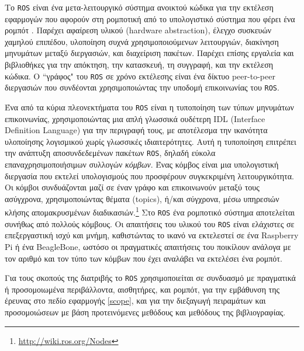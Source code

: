 Το \texttt{ROS} είναι ένα μετα-λειτουργικό σύστημα ανοικτού κώδικα για την
εκτέλεση εφαρμογών που αφορούν στη ρομποτική από το υπολογιστικό σύστημα που
φέρει ένα ρομπότ \cite{Ng2009}. Παρέχει αφαίρεση υλικού (hardware abstraction),
έλεγχο συσκευών χαμηλού επιπέδου, υλοποίηση συχνά χρησιμοποιούμενων
λειτουργιών, διακίνηση μηνυμάτων μεταξύ διεργασιών, και διαχείριση πακέτων.
Παρέχει επίσης εργαλεία και βιβλιοθήκες για την απόκτηση, την κατασκευή, τη
συγγραφή, και την εκτέλεση κώδικα. Ο ``γράφος" του \texttt{ROS} σε χρόνο
εκτέλεσης είναι ένα δίκτυο peer-to-peer διεργασιών που συνδέονται
χρησιμοποιώντας την υποδομή επικοινωνίας του \texttt{ROS}.

Ένα από τα κύρια πλεονεκτήματα του \texttt{ROS} είναι η τυποποίηση των τύπων
μηνυμάτων επικοινωνίας, χρησιμοποιώντας μια απλή γλωσσικά ουδέτερη IDL
(Interface Definition Language) για την περιγραφή τους, με αποτέλεσμα την
ικανότητα υλοποίησης λογισμικού χωρίς γλωσσικές ιδιαιτερότητες. Αυτή η
τυποποίηση επιτρέπει την ανάπτυξη αποσυνδεδεμένων πακέτων \texttt{ROS}, δηλαδή
εύκολα επαναχρησιμοποιήσιμων συλλογών \textit{κόμβων}. Ένας κόμβος είναι μια
υπολογιστική διεργασία που εκτελεί υπολογισμούς που προσφέρουν συγκεκριμένη
λειτουργικότητα. Οι κόμβοι συνδυάζονται μαζί σε έναν γράφο και επικοινωνούν
μεταξύ τους ασύγχρονα, χρησιμοποιώντας θέματα (topics), ή/και σύγχρονα, μέσω
υπηρεσιών κλήσης απομακρυσμένων
διαδικασιών.\footnote{\url{http://wiki.ros.org/Nodes}} Στο \texttt{ROS} ένα
ρομποτικό σύστημα αποτελείται συνήθως από πολλούς κόμβους. Οι απαιτήσεις του
υλικού του \texttt{ROS} είναι ελάχιστες σε επεξεργαστική ισχύ και μνήμη,
καθιστώντας το ικανό να εκτελεστεί σε ένα Raspberry Pi ή ένα BeagleBone, ωστόσο
οι πραγματικές απαιτήσεις του ποικίλουν ανάλογα με τον αριθμό και τον τύπο των
κόμβων που έχει αναλάβει να εκτελέσει ένα ρομπότ.

Για τους σκοπούς της διατριβής το \texttt{ROS} χρησιμοποιείται σε συνδυασμό με
πραγματικά ή προσομοιωμένα περιβάλλοντα, αισθητήρες, και ρομπότ, για την
εμβάθυνση της έρευνας στο πεδίο εφαρμογής \ref{scope}, και για την διεξαγωγή
πειραμάτων και προσομοιώσεων με βάση προτεινόμενες μεθόδους και μεθόδους της
βιβλιογραφίας.
